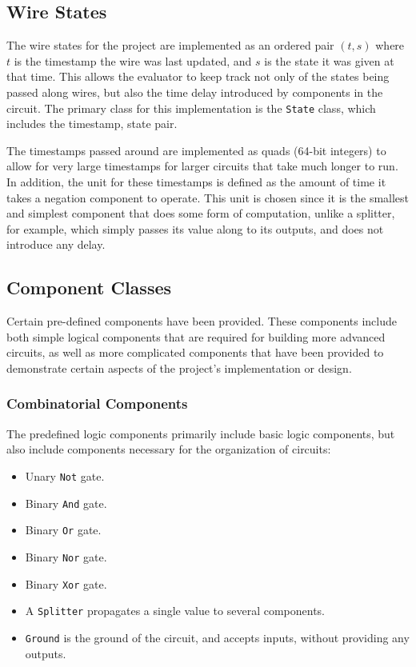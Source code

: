 \documentclass{article}
\newcommand{\ClassName}[1]{\texttt{#1}}
\begin{document}
\subsection{Wire States}

The wire states for the project are implemented as an ordered pair $(t,s)$ where $t$ is the timestamp the wire was last updated, and $s$ is the state it was given at that time. This allows the evaluator to keep track not only of the states being passed along wires, but also the time delay introduced by components in the circuit. The primary class for this implementation is the \ClassName{State} class, which includes the timestamp, state pair.

The timestamps passed around are implemented as quads (64-bit integers) to allow for very large timestamps for larger circuits that take much longer to run. In addition, the unit for these timestamps is defined as the amount of time it takes a negation component to operate. This unit is chosen since it is the smallest and simplest component that does some form of computation, unlike a splitter, for example, which simply passes its value along to its outputs, and does not introduce any delay.

\subsection{Component Classes}

Certain pre-defined components have been provided. These components include both simple logical components that are required for building more advanced circuits, as well as more complicated components that have been provided to demonstrate certain aspects of the project's implementation or design.

\subsubsection{Combinatorial Components}

The predefined logic components primarily include basic logic components, but also include components necessary for the organization of circuits:

\begin{itemize}

\item Unary \ClassName{Not} gate.

\item Binary \ClassName{And} gate.

\item Binary \ClassName{Or} gate.

\item Binary \ClassName{Nor} gate.

\item Binary \ClassName{Xor} gate.

\item A \ClassName{Splitter} propagates a single value to several components.

\item \ClassName{Ground} is the ground of the circuit, and accepts inputs, without providing any outputs.

\end{itemize}
\end{document}
